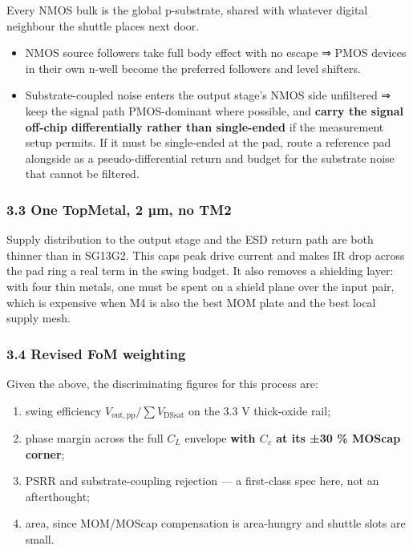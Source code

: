 \documentclass[
  10pt,
  a4paper,
]{article}
\providecommand{\tightlist}{%
  \setlength{\itemsep}{0pt}\setlength{\parskip}{0pt}}
\begin{document}
Every NMOS bulk is the global p-substrate, shared with whatever digital
neighbour the shuttle places next door.

\begin{itemize}
\tightlist
\item
  NMOS source followers take full body effect with no escape ⇒ PMOS
  devices in their own n-well become the preferred followers and level
  shifters.
\item
  Substrate-coupled noise enters the output stage's NMOS side unfiltered
  ⇒ keep the signal path PMOS-dominant where possible, and \textbf{carry
  the signal off-chip differentially rather than single-ended} if the
  measurement setup permits. If it must be single-ended at the pad,
  route a reference pad alongside as a pseudo-differential return and
  budget for the substrate noise that cannot be filtered.
\end{itemize}

\hypertarget{one-topmetal-2-uxb5m-no-tm2}{%
\subsubsection{3.3 One TopMetal, 2 µm, no
TM2}\label{one-topmetal-2-uxb5m-no-tm2}}

Supply distribution to the output stage and the ESD return path are both
thinner than in SG13G2. This caps peak drive current and makes IR drop
across the pad ring a real term in the swing budget. It also removes a
shielding layer: with four thin metals, one must be spent on a shield
plane over the input pair, which is expensive when M4 is also the best
MOM plate and the best local supply mesh.

\hypertarget{revised-fom-weighting}{%
\subsubsection{3.4 Revised FoM weighting}\label{revised-fom-weighting}}

Given the above, the discriminating figures for this process are:

\begin{enumerate}
\def\labelenumi{\arabic{enumi}.}
\tightlist
\item
  swing efficiency \(V_\mathrm{out,pp}/\sum V_\mathrm{DSsat}\) on the
  3.3 V thick-oxide rail;
\item
  phase margin across the full \(C_L\) envelope \textbf{with \(C_c\) at
  its ±30 \% MOScap corner};
\item
  PSRR and substrate-coupling rejection --- a first-class spec here, not
  an afterthought;
\item
  area, since MOM/MOScap compensation is area-hungry and shuttle slots
  are small.
\end{enumerate}
\end{document}
